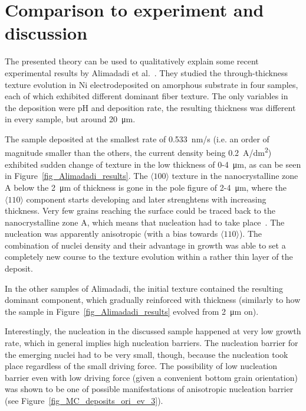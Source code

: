\section{Comparison to experiment and discussion}\label{sec_MC_to_experiment}

The presented theory can be used to qualitatively explain some recent experimental results by Alimadadi et al.~\cite{Alimadadi2016}. They studied the through-thickness texture evolution in Ni electrodeposited on amorphous substrate in four samples, each of which exhibited different dominant fiber texture. The only variables in the deposition were pH and deposition rate, the resulting thickness was different in every sample, but around \qty{20}{\um}. 

The sample deposited at the smallest rate of \qty{0.533}{\nano\meter/\second} (i.e. an order of magnitude smaller than the others, the current density being \qty{0.2}{\A/\deci\meter^2}) exhibited sudden change of texture in the low thickness of 0-4~\unit{\um}, as can be seen in Figure~\ref{fig_Alimadadi_results}. The $\langle100\rangle$ texture in the nanocrystalline zone A below the 2~\unit{\um} of thickness is gone in the pole figure of 2-4~\unit{\um}, where the $\langle110\rangle$ component starts developing and later strenghtens with increasing thickness. Very few grains reaching the surface could be traced back to the nanocrystalline zone A, which means that nucleation had to take place~\cite{Alimadadi2016}. The nucleation was apparently anisotropic (with a bias towards $\langle110\rangle$). The combination of nuclei density and their advantage in growth was able to set a completely new course to the texture evolution within a rather thin layer of the deposit. 

In the other samples of Alimadadi, the initial texture contained the resulting dominant component, which gradually reinforced with thickness (similarly to how the sample in Figure~\ref{fig_Alimadadi_results} evolved from \qty{2}{\um} on). 

Interestingly, the nucleation in the discussed sample happened at very low growth rate, which in general implies high nucleation barriers. The nucleation barrier for the emerging nuclei had to be very small, though, because the nucleation took place regardless of the small driving force. The possibility of low nucleation barrier even with low driving force (given a convenient bottom grain orientation) was shown to be one of possible manifestations of anisotropic nucleation barrier (see Figure~\ref{fig_MC_deposits_ori_ev_3}).

